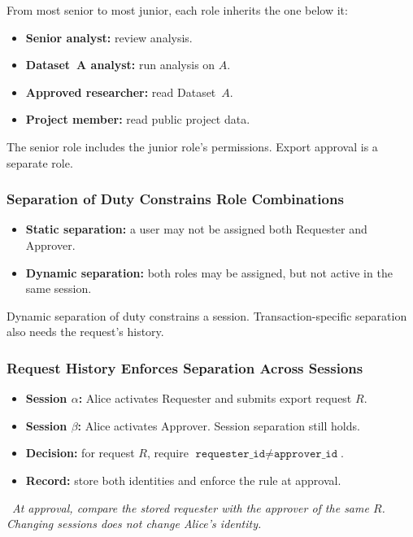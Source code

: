 \documentclass[hidelinks]{article}
\newcommand{\callout}[1]{\par\smallskip\noindent{\color{capri}$\blacktriangleright$}\ \textit{#1}\par\smallskip}
\begin{document}
From most senior to most junior, each role inherits the one below it:
\begin{itemize}
    \item \textbf{Senior analyst:} review analysis.
    \item \textbf{Dataset~A analyst:} run analysis on $A$.
    \item \textbf{Approved researcher:} read Dataset~$A$.
    \item \textbf{Project member:} read public project data.
\end{itemize}
The senior role includes the junior role's permissions. Export approval is a separate role.

\subsubsection{Separation of Duty Constrains Role Combinations}

\begin{itemize}
    \item \textbf{Static separation:} a user may not be assigned both Requester and Approver.
    \item \textbf{Dynamic separation:} both roles may be assigned, but not active in the same session.
\end{itemize}
Dynamic separation of duty constrains a session. Transaction-specific separation also needs the request's history.

\subsubsection{Request History Enforces Separation Across Sessions}

\begin{itemize}
    \item \textbf{Session $\alpha$:} Alice activates Requester and submits export request $R$.
    \item \textbf{Session $\beta$:} Alice activates Approver. Session separation still holds.
    \item \textbf{Decision:} for request $R$, require $\texttt{requester\_id} \neq \texttt{approver\_id}$.
    \item \textbf{Record:} store both identities and enforce the rule at approval.
\end{itemize}

\callout{At approval, compare the stored requester with the approver of the same $R$. Changing sessions does not change Alice's identity.}
\end{document}
